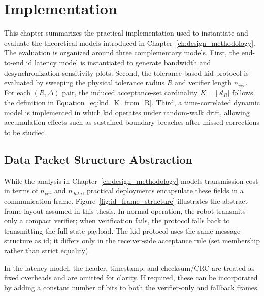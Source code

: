 \chapter{Implementation}
\label{ch:implementation}
\label{sec:implementation}

This chapter summarizes the practical implementation used to instantiate and evaluate the theoretical models introduced in Chapter~\ref{ch:design_methodology}. The evaluation is organized around three complementary models. First, the end-to-end \gls{id} latency model is instantiated to generate bandwidth and desynchronization sensitivity plots. Second, the tolerance-based \gls{kid} protocol is evaluated by sweeping the physical tolerance radius $R$ and verifier length $n_{ver}$. For each $(R,\Delta)$ pair, the induced acceptance-set cardinality $K=|\mathcal{A}_R|$ follows the definition in Equation~\eqref{eq:kid_K_from_R}. Third, a time-correlated dynamic model is implemented in which \gls{kid} operates under random-walk drift, allowing accumulation effects such as sustained boundary breaches after missed corrections to be studied.

\label{sec:implementation_design}

\section{Data Packet Structure Abstraction}
\label{sec:packet_structure}
While the analysis in Chapter~\ref{ch:design_methodology} models transmission cost in terms of $n_{ver}$ and $n_{data}$, practical deployments encapsulate these fields in a communication frame. Figure~\ref{fig:id_frame_structure} illustrates the abstract frame layout assumed in this thesis. In normal operation, the robot transmits only a compact verifier; when verification fails, the protocol falls back to transmitting the full state payload. The \gls{kid} protocol uses the same message structure as \gls{id}; it differs only in the receiver-side acceptance rule (set membership rather than strict equality).

In the latency model, the header, timestamp, and checksum/CRC are treated as fixed overheads and are omitted for clarity. If required, these can be incorporated by adding a constant number of bits to both the verifier-only and fallback frames.

